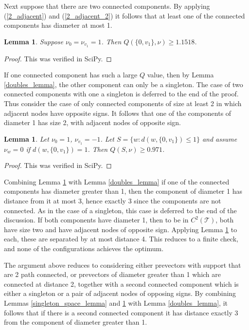 \documentclass[a4paper, 12pt, notitlepage]{amsart}
\newcommand{\sT}{\mathscr{T}}
\newtheorem{lemma}[theorem]{Lemma}
\theoremstyle{remark}
\begin{document}
Next suppose that there are two connected components.  By applying (\ref{2_adjacent}) and (\ref{2_adjacent_2}) it follows that at least one of the connected components has diameter at most 1.
\begin{lemma}
 Suppose $\nu_0 = \nu_{v_1} = 1$. Then $Q(\{0, v_1\}, \nu) \geq 1.1518$.
\end{lemma}
\begin{proof}
 This was verified in SciPy.
\end{proof}
If one connected component has such a large $Q$ value, then by Lemma \ref{doubles_lemma}, the other component can only be a singleton.  The case of two connected components with one a singleton is deferred to the end of the proof.  Thus consider the case of only connected components of size at least 2 in which adjacent nodes have opposite signs.  It follows that one of the components of diameter 1 has size 2, with adjacent nodes of opposite sign.
\begin{lemma}\label{signed_adjacent_spaced_lemma}
 Let $\nu_0 = 1$, $\nu_{v_1}=-1$.  Let $S = \{w: d(w, \{0, v_1\})\leq 1\}$ and assume $\nu_w = 0$ if $d(w, \{0, v_1\}) = 1$.  Then $Q(S, \nu) \geq 0.971$.
\end{lemma}
\begin{proof}
 This was verified in SciPy.
\end{proof}
Combining Lemma \ref{signed_adjacent_spaced_lemma} with Lemma \ref{doubles_lemma} if one of the connected components has diameter greater than 1, then the component of diameter 1 has distance from it at most 3, hence exactly 3 since the components are not connected.  As in the case of a singleton, this case is deferred to the end of the discussion.  If both components have diameter 1, then to be in $C^2(\sT)$, both have size two and have adjacent nodes of opposite sign.  Applying Lemma \ref{signed_adjacent_spaced_lemma} to each, these are separated by at most distance 4.  This reduces to a finite check, and none of the configurations achieves the optimum. 


The argument above  reduces to considering either prevectors with support that are 2 path connected, or prevectors of diameter greater than 1 which are connected at distance 2, together with a second  connected component which is either a singleton or a pair of adjacent nodes of opposing signs.  By combining Lemmas \ref{singleton_space_lemma} and \ref{signed_adjacent_spaced_lemma} with Lemma \ref{doubles_lemma}, it follows that if there is a second connected component it has distance exactly 3 from the component of diameter greater than 1.
\end{document}
